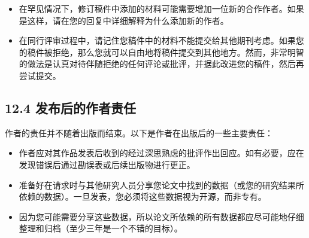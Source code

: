 \begin{itemize}
\item 在罕见情况下，修订稿件中添加的材料可能需要增加一位新的合作作者。如果是这样，请在您的回复中详细解释为什么添加新的作者。
\item 在同行评审过程中，请记住您稿件中的材料不能提交给其他期刊考虑。如果您的稿件被拒绝，那么您就可以自由地将稿件提交到其他地方。然而，非常明智的做法是认真对待伴随拒绝的任何评论或批评，并据此改进您的稿件，然后再尝试提交。
\end{itemize}

\subsection*{12.4 发布后的作者责任}
作者的责任并不随着出版而结束。以下是作者在出版后的一些主要责任：

\begin{itemize}
\item 作者应对其作品发表后收到的经过深思熟虑的批评作出回应。如有必要，应在发现错误后通过勘误表或后续出版物进行更正。
\item 准备好在请求时与其他研究人员分享您论文中找到的数据（或您的研究结果所依赖的数据）。一旦发表，您必须将这些数据视为开源，而非专有。
\item 因为您可能需要分享这些数据，所以论文所依赖的所有数据都应尽可能地仔细整理和归档（至少三年是一个不错的目标）。
\end{itemize}

